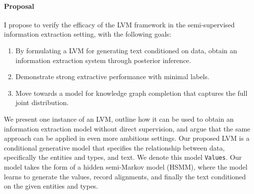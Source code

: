 \documentclass[12pt]{article}
\newcommand{\ba}{\mathbf{a}}
\newcommand{\be}{\mathbf{e}}
\newcommand{\bt}{\mathbf{t}}
\newcommand{\bv}{\mathbf{v}}
\newcommand{\by}{\mathbf{y}}
\begin{document}
\paragraph{Proposal}
I propose to verify the efficacy of the LVM framework in the
semi-supervised information extraction setting,
with the following goals:
\begin{enumerate}
\item By formulating a LVM for generating text conditioned on data,
    obtain an information extraction system through posterior inference.
\item Demonstrate strong extractive performance with minimal labels.
\item Move towards a model for knowledge graph completion that captures
    the full joint distribution.
\end{enumerate}
We present one instance of an LVM, outline how it can be used to obtain
an information extraction model without direct supervision,
and argue that the same approach can be applied in even more ambitious settings.
Our proposed LVM is a conditional generative model that specifies
the relationship between data, specifically the entities and types, and text.
We denote this model \texttt{Values}.
Our model takes the form of a hidden semi-Markov model (HSMM),
where the model learns to generate the values, record alignments, and finally the text
conditioned on the given entities and types.
\end{document}
